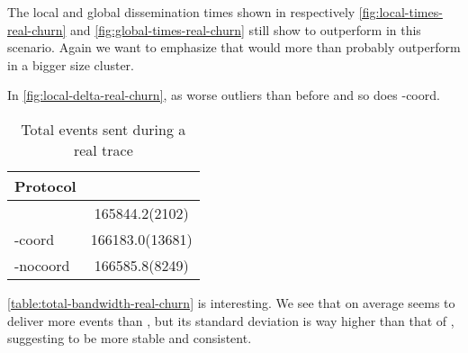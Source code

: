 % 	
% 	
The local and global dissemination times shown in respectively \autoref{fig:local-times-real-churn} and \autoref{fig:global-times-real-churn} still show \jgroups to outperform \epto in this scenario. Again we want to emphasize that \epto would more than probably outperform \jgroups in a bigger size cluster.
\par
% 	
In \autoref{fig:local-delta-real-churn}, \epto as worse outliers than before and so does \jgroups-coord.
\begin{table}[hpt]
	\centering
	\caption{Total events sent during a real trace}
\begin{tabular}{lS}
	\toprule
	Protocol &\\
	\midrule
	\epto & 165844.2(2102)\\
	\jgroups-coord & 166183.0(13681)\\
	\jgroups-nocoord & 166585.8(8249)\\
	\bottomrule
\end{tabular}
    \label{table:total-sent-real-churn}
\end{table}
\autoref{table:total-bandwidth-real-churn} is interesting. We see that on average \jgroups seems to deliver more events than \epto, but its standard deviation is way higher than that of \epto, suggesting \epto to be more stable and consistent.
%	

